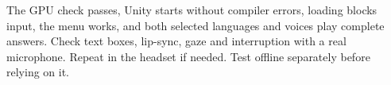 The GPU check passes, Unity starts without compiler errors, loading blocks input,
the menu works, and both selected languages and voices play complete answers.
Check text boxes, lip-sync, gaze and interruption with a real microphone.
Repeat in the headset if needed. Test offline separately before relying on it.
